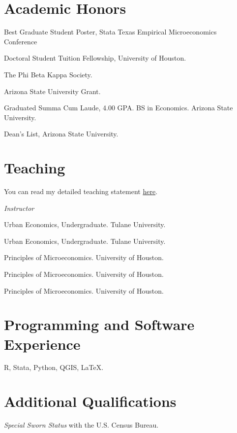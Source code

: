 \documentclass[letterpaper]{article}
\renewenvironment{itemize}{
  \begin{list}{}{
    \setlength{\leftmargin}{1.5em}
  }
}{
  \end{list}
}
\begin{document}
\section*{Academic Honors}
\vspace{2 mm}
\begin{itemize}
\item {} Best Graduate Student Poster, Stata Texas Empirical Microeconomics Conference
\item {} Doctoral Student Tuition Fellowship, University of Houston. 
\item {} The Phi Beta Kappa Society. 
\item {} Arizona State University Grant. 
\item {} Graduated Summa Cum Laude, 4.00 GPA. BS in Economics. Arizona State University. 
\item {} Dean's List, Arizona State University. 
\end{itemize}
\vspace{2 mm}

\section*{Teaching}
\vspace{2 mm}

You can read my detailed teaching statement \href{https://hhadah.github.io/statements/Hadah_Teaching.pdf}{here}.

\textit{Instructor}
\begin{itemize}
\item {}Urban Economics, Undergraduate. Tulane University.
\item {}Urban Economics, Undergraduate. Tulane University.
\item {}Principles of Microeconomics. University of Houston.
\item {}Principles of Microeconomics. University of Houston.
\item {}Principles of Microeconomics. University of Houston.

\end{itemize}

\section*{Programming and Software Experience}
\vspace{2 mm}
{\makebox[2.3cm]{\hfill}}R, Stata, Python, QGIS, \LaTeX.
\vspace{2 mm}

\section*{Additional Qualifications}
\vspace{2 mm}
{\makebox[2.3cm]{\hfill}}\textit{Special Sworn Status} with the U.S. Census Bureau.
\vspace{2 mm}
\end{document}
